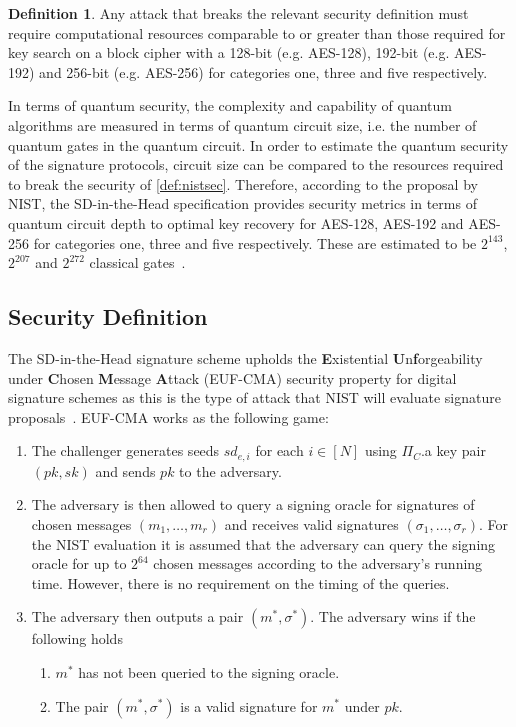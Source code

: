 \documentclass[11pt]{report}
\theoremstyle{definition}
\newtheorem{definition}{Definition}[section]
\theoremstyle{plain}
\begin{document}
\begin{definition}\label{def:nistsec}
  Any attack that breaks the relevant security definition must require computational resources comparable to or greater than those required for key search on a block cipher with a 128-bit (e.g. AES-128), 192-bit (e.g. AES-192) and 256-bit (e.g. AES-256) for categories one, three and five respectively.
\end{definition}

In terms of quantum security, the complexity and capability of quantum algorithms are measured in terms of quantum circuit size, i.e. the number of quantum gates in the quantum circuit. In order to estimate the quantum security of the signature protocols, circuit size can be compared to the resources required to break the security of \autoref{def:nistsec}. Therefore,
according to the proposal by NIST, the SD-in-the-Head specification provides security metrics in terms of quantum circuit depth to optimal key recovery for AES-128, AES-192 and AES-256 for categories one, three and five respectively. These are estimated to be $2^{143}$, $2^{207}$ and $2^{272}$ classical gates~\cite{nistcall}.

\subsection{Security Definition}

The SD-in-the-Head signature scheme upholds the \textbf{E}xistential \textbf{U}n\textbf{f}orgeability under \textbf{C}hosen \textbf{M}essage \textbf{A}ttack (EUF-CMA) security property for digital signature schemes as this is the type of attack that NIST will evaluate signature proposals~\cite{nistcall,aguilarsyndrome11}. EUF-CMA works as the following game:

\begin{enumerate}
  \item The challenger generates seeds $sd_{e,i}$ for each $i \in [N]$ using $\Pi_C$.a key pair $(pk, sk)$ and sends $pk$ to the adversary.
  \item The adversary is then allowed to query a signing oracle for signatures of chosen messages $(m_1, \dots, m_r)$ and receives valid signatures $(\sigma_1, \dots, \sigma_r)$. For the NIST evaluation it is assumed that the adversary can query the signing oracle for up to $2^{64}$ chosen messages according to the adversary's running time. However, there is no requirement on the timing of the queries.
  \item The adversary then outputs a pair $(m^*, \sigma^*)$. The adversary wins if the following holds
        \begin{enumerate}
          \item $m^*$ has not been queried to the signing oracle.
          \item The pair $(m^*, \sigma^*)$ is a valid signature for $m^*$ under $pk$.
        \end{enumerate}
\end{enumerate}
\end{document}
